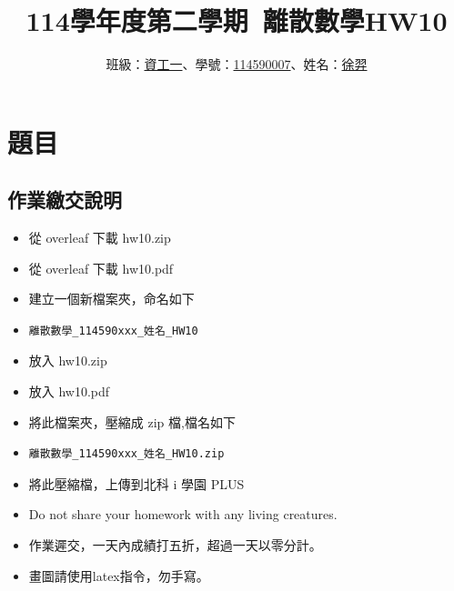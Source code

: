 \documentclass[sigconf]{acmart}
\begin{document}
\title{114學年度第二學期~離散數學HW10}

\author{班級：\underline{資工一}、學號：\underline{114590007}、姓名：\underline{徐羿}}
\orcid{}
\affiliation{%
  \institution{}
  \city{}
  \country{}
}


\renewcommand\footnotetextcopyrightpermission[1]{} %
\pagestyle{plain} %

\maketitle


\section{題目}
\subsection{作業繳交說明}
\begin{shaded}
\begin{itemize}
    \item[-] 從 overleaf 下載 hw10.zip
    \item[-] 從 overleaf 下載 hw10.pdf
    \item[-] 建立一個新檔案夾，命名如下
    \item[-] \color{red}\begin{verbatim}離散數學_114590xxx_姓名_HW10\end{verbatim}
    \item[-] \color{black}放入 hw10.zip
    \item[-] 放入 hw10.pdf
    \item[-] 將此檔案夾，壓縮成 zip 檔,檔名如下
    \item[-] \color{red}\begin{verbatim}離散數學_114590xxx_姓名_HW10.zip\end{verbatim}
    \item[-] \color{black}將此壓縮檔，上傳到北科 i 學園 PLUS
    \item[-] Do not share your homework with any living creatures.
    \item[-] 作業遲交，一天內成績打五折，超過一天以零分計。
    \item[-] 畫圖請使用latex指令，勿手寫。
\end{itemize}
\end{shaded}
\end{document}
